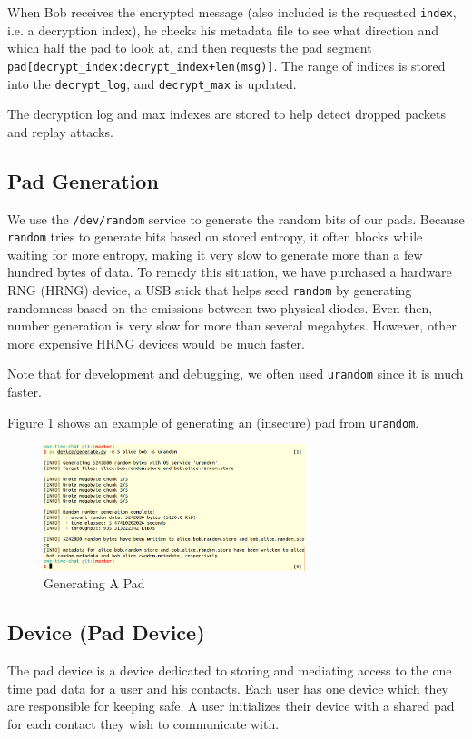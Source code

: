 \documentclass[twocolumn]{article}
\begin{document}
When Bob receives the encrypted message (also included is the requested \texttt{index}, i.e. a decryption index), he checks his metadata file to see what direction and which half the pad to look at, and then requests the pad segment \texttt{pad[decrypt\_index:decrypt\_index+len(msg)]}. The range of indices is stored into the \texttt{decrypt\_log}, and \texttt{decrypt\_max} is updated.

The decryption log and max indexes are stored to help detect dropped packets and replay attacks.

\subsection{Pad Generation}
\label{sec:padgen}
We use the \texttt{/dev/random} service to generate the random bits of our pads. Because \texttt{random} tries to generate bits based on stored entropy, it often blocks while waiting for more entropy, making it very slow to generate more than a few hundred bytes of data. To remedy this situation, we have purchased a hardware RNG (HRNG) device, a USB stick that helps seed \texttt{random} by generating randomness based on the emissions between two physical diodes. Even then, number generation is very slow for more than several megabytes. However, other more expensive HRNG devices would be much faster.

Note that for development and debugging, we often used \texttt{urandom} since it is much faster.

Figure \ref{fig:genpad} shows an example of generating an (insecure) pad from \texttt{urandom}.

\begin{figure}[htp]
\centering
\includegraphics[width=3in]{generate}
\caption{Generating A Pad}
\label{fig:genpad}
\end{figure}


\subsection{Device (Pad Device)}
The pad device is a device dedicated to storing and mediating access to the one time pad data for a user and his contacts. Each user has one device which they are responsible for keeping safe. A user initializes their device with a shared pad for each contact they wish to communicate with.
\end{document}
